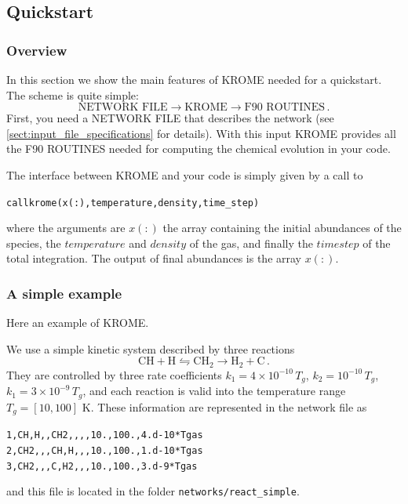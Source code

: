 \documentclass[10pt]{article}
\begin{document}
\subsection{Quickstart}
\subsubsection{Overview}
In this section we show the main features of KROME needed for a quickstart.
The scheme is quite simple: 
\begin{equation}
	\mathrm{NETWORK\,\,FILE}\longrightarrow\mathrm{KROME}\longrightarrow\mathrm{F90\,\,ROUTINES}\,.\nonumber
\end{equation}
First, you need a NETWORK FILE that describes the network (see \ref{sect:input_file_specifications} for details). With this input KROME provides all the F90 ROUTINES needed for computing the chemical evolution in your code.

The interface between KROME and your code is simply given by a call to
\begin{alltt}
	call krome(x(:), temperature, density, time_step)
\end{alltt}
where the arguments are $x(:)$ the array containing the initial abundances of the species, the $temperature$ and $density$ of the gas, and finally the $time step$ of the total integration. The output of final abundances is the array $x(:)$.

\subsubsection{A simple example}
Here an example of KROME.

We use a simple kinetic system described by three reactions
\begin{equation}
\mathrm{CH}+\mathrm{H} \leftrightharpoons \mathrm{CH_2} \rightarrow \mathrm{H_2}+\mathrm{C}\,.
\end{equation}
They are controlled by three rate coefficients $k_1=4\times10^{-10}\,T_g$, $k_2=10^{-10}\,T_g$, $k_1=3\times10^{-9}\,T_g$,
and each reaction is valid into the temperature range $T_g=[10,100]$ K. These information are represented in the network file as
\begin{alltt}
	1,CH,H,,CH2,,,,10.,100.,4.d-10*Tgas
	2,CH2,,,CH,H,,,10.,100.,1.d-10*Tgas
	3,CH2,,,C,H2,,,10.,100.,3.d-9*Tgas
\end{alltt}

and this file is located in the folder \verb|networks/react_simple|.
\end{document}
